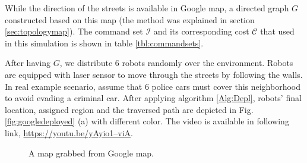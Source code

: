 \documentclass[twocolumn]{svjour3}       %
\begin{document}
%
While the direction of the streets is available in Google map, a directed graph $G$ constructed based on this map (the method was explained in section \ref{sec:topologymap}). The command set $\mathcal{I}$ and its corresponding cost $\mathcal{C}$ that used in this simulation is shown in table \ref{tbl:commandsets}.

%
After having $G$, we distribute 6 robots randomly over the environment. Robots are equipped with laser sensor to move through the streets by following the walls. 
%
In real example scenario, assume that 6 police cars must cover this neighborhood to avoid evading a criminal car. After applying algorithm \ref{Alg:Depl}, robots' final location, assigned region and the traversed path are depicted in Fig. \ref{fig:googledeployed} (a) with different color. The video is available in following link, \href{https://youtu.be/yAyio1--viA}{https://youtu.be/yAyio1--viA}.

\begin{figure}[h]
	\centering	
	\caption{A map grabbed from Google map.}
	\label{fig:googlemap}
\end{figure}
%
\end{document}
